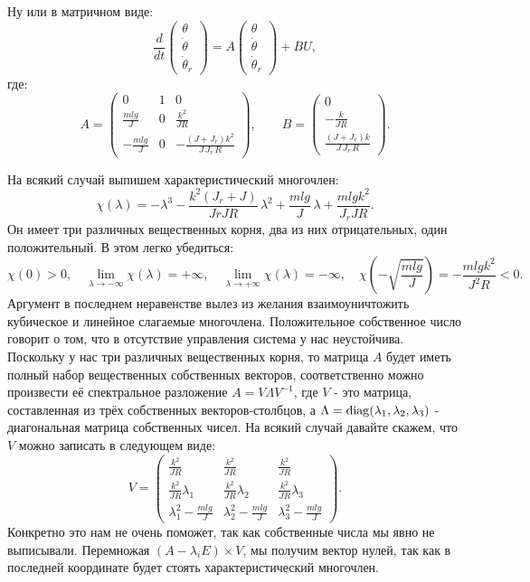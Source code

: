 \documentclass{article}
\DeclarePairedDelimiter{\diagfences}{(}{)}
\newcommand{\diag}{\operatorname{diag}\diagfences}
\begin{document}
Ну или в матричном виде: 
$$
\frac{d}{dt}\begin{pmatrix}\theta \\ \dot\theta \\ \dot\theta_r \end{pmatrix} = A \begin{pmatrix}\theta \\ \dot\theta \\ \dot\theta_r \end{pmatrix} + B U,
$$
где:
$$
A= \begin{pmatrix} 0 & 1 & 0 \\ \frac{mlg}{J} & 0 & \frac{k^2}{JR} \\ -\frac{mlg}{J} & 0 & -\frac{(J+J_r)k^2}{J\,J_r\,R} \end{pmatrix},
\qquad 
B=\begin{pmatrix}0\\ -\frac{k}{JR} \\ \frac{(J+J_r)k}{J\,J_r\,R} \end{pmatrix}.
$$

На всякий случай выпишем характеристический многочлен:
$$\chi(\lambda) = -\lambda^3 - \frac{k^2(J_r+J)}{JrJR}\,\lambda^2 + \frac{mlg}{J}\,\lambda+\frac{mlgk^2}{J_rJR}.$$
Он имеет три различных вещественных корня, два из них отрицательных, один положительный. В этом легко убедиться:
$$
\chi(0)>0,\quad \lim\limits_{\lambda\rightarrow-\infty}\chi(\lambda)=+\infty,\quad \lim\limits_{\lambda\rightarrow+\infty}\chi(\lambda)=-\infty,\quad\chi\left(-\sqrt{\frac{mlg}{J}}\right) = -\frac{mlg k^2}{J^2 R}<0.
$$
Аргумент в последнем неравенстве вылез из желания взаимоуничтожить кубическое и линейное слагаемые многочлена.
Положительное собственное число говорит о том, что в отсутствие управления система у нас неустойчива.
Поскольку у нас три различных вещественных корня, то матрица $A$ будет иметь полный набор вещественных собственных векторов, соответственно можно произвести её спектральное разложение $A = V \Lambda V^{-1}$, где $V$ - это матрица, составленная из трёх собственных векторов-столбцов, а $\Lambda=\diag{\lambda_1, \lambda_2, \lambda_3}$ - диагональная матрица собственных чисел.
На всякий случай давайте скажем, что $V$ можно записать в следующем виде:
$$
V=\begin{pmatrix}
\frac{k^2}{JR}              & \frac{k^2}{JR}              & \frac{k^2}{JR}               \\
\frac{k^2}{JR}\lambda_1     & \frac{k^2}{JR}\lambda_2     & \frac{k^2}{JR}\lambda_3      \\
\lambda^2_1 - \frac{mlg}{J} & \lambda^2_2 - \frac{mlg}{J} & \lambda^2_3 - \frac{mlg}{J} 
\end{pmatrix}.
$$
Конкретно это нам не очень поможет, так как собственные числа мы явно не выписывали. Перемножая $(A-\lambda_iE)\times V$, мы получим вектор нулей, так как в последней координате будет стоять характеристический многочлен.
\end{document}
